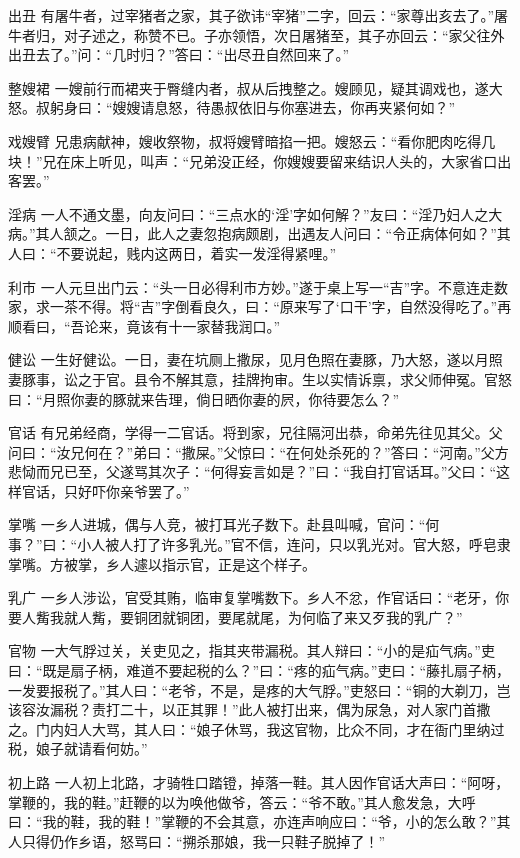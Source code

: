 \documentclass[12pt,UTF8]{ctexbook}
\begin{document}
出丑
有屠牛者，过宰猪者之家，其子欲讳“宰猪”二字，回云：“家尊出亥去了。”屠牛者归，对子述之，称赞不已。子亦领悟，次日屠猪至，其子亦回云：“家父往外出丑去了。”问：“几时归？”答曰：“出尽丑自然回来了。”

整嫂裙
一嫂前行而裙夹于臀缝内者，叔从后拽整之。嫂顾见，疑其调戏也，遂大怒。叔躬身曰：“嫂嫂请息怒，待愚叔依旧与你塞进去，你再夹紧何如？”

戏嫂臂
兄患病献神，嫂收祭物，叔将嫂臂暗掐一把。嫂怒云：“看你肥肉吃得几块！”兄在床上听见，叫声：“兄弟没正经，你嫂嫂要留来结识人头的，大家省口出客罢。”

淫病
一人不通文墨，向友问曰：“三点水的‘淫’字如何解？”友曰：“淫乃妇人之大病。”其人颔之。一日，此人之妻忽抱病颇剧，出遇友人问曰：“令正病体何如？”其人曰：“不要说起，贱内这两日，着实一发淫得紧哩。”

利市
一人元旦出门云：“头一日必得利市方妙。”遂于桌上写一“吉”字。不意连走数家，求一茶不得。将“吉”字倒看良久，曰：“原来写了‘口干’字，自然没得吃了。”再顺看曰，“吾论来，竟该有十一家替我润口。”

健讼
一生好健讼。一日，妻在坑厕上撒尿，见月色照在妻豚，乃大怒，遂以月照妻豚事，讼之于官。县令不解其意，挂牌拘审。生以实情诉禀，求父师伸冤。官怒曰：“月照你妻的豚就来告理，倘日晒你妻的屄，你待要怎么？”

官话
有兄弟经商，学得一二官话。将到家，兄往隔河出恭，命弟先往见其父。父问曰：“汝兄何在？”弟曰：“撒屎。”父惊曰：“在何处杀死的？”答曰：“河南。”父方悲恸而兄已至，父遂骂其次子：“何得妄言如是？”曰：“我自打官话耳。”父曰：“这样官话，只好吓你亲爷罢了。”

掌嘴
一乡人进城，偶与人竞，被打耳光子数下。赴县叫喊，官问：“何事？”曰：“小人被人打了许多乳光。”官不信，连问，只以乳光对。官大怒，呼皂隶掌嘴。方被掌，乡人遽以指示官，正是这个样子。

乳广
一乡人涉讼，官受其贿，临审复掌嘴数下。乡人不忿，作官话曰：“老牙，你要人觜我就人觜，要铜团就铜团，要尾就尾，为何临了来又歹我的乳广？”

官物
一大气脬过关，关吏见之，指其夹带漏税。其人辩曰：“小的是疝气病。”吏曰：“既是扇子柄，难道不要起税的么？”曰：“疼的疝气病。”吏曰：“藤扎扇子柄，一发要报税了。”其人曰：“老爷，不是，是疼的大气脬。”吏怒曰：“铜的大剃刀，岂该容汝漏税？责打二十，以正其罪！”此人被打出来，偶为尿急，对人家门首撒之。门内妇人大骂，其人曰：“娘子休骂，我这官物，比众不同，才在衙门里纳过税，娘子就请看何妨。”

初上路
一人初上北路，才骑牲口踏镫，掉落一鞋。其人因作官话大声曰：“阿呀，掌鞭的，我的鞋。”赶鞭的以为唤他做爷，答云：“爷不敢。”其人愈发急，大呼曰：“我的鞋，我的鞋！”掌鞭的不会其意，亦连声响应曰：“爷，小的怎么敢？”其人只得仍作乡语，怒骂曰：“搠杀那娘，我一只鞋子脱掉了！”
\end{document}

